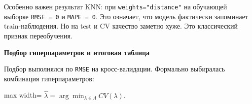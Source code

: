 \documentclass[11pt]{article}
\begin{document}
Особенно важен результат KNN: при \texttt{weights="distance"} на
обучающей выборке \texttt{RMSE\ =\ 0} и \texttt{MAPE\ =\ 0}. Это
означает, что модель фактически запоминает train-наблюдения. Но на test
и CV качество заметно хуже. Это классический признак переобучения.

    \textbf{Подбор гиперпараметров и итоговая таблица}

Подбор выполнялся по \texttt{RMSE} на кросс-валидации. Формально
выбиралась комбинация гиперпараметров:

\begin{center}
\begin{adjustbox}{max width=\linewidth}
\(\displaystyle \hat\lambda = \arg\min_{\lambda \in \Lambda} CV(\lambda).\)
\end{adjustbox}
\end{center}
\end{document}
